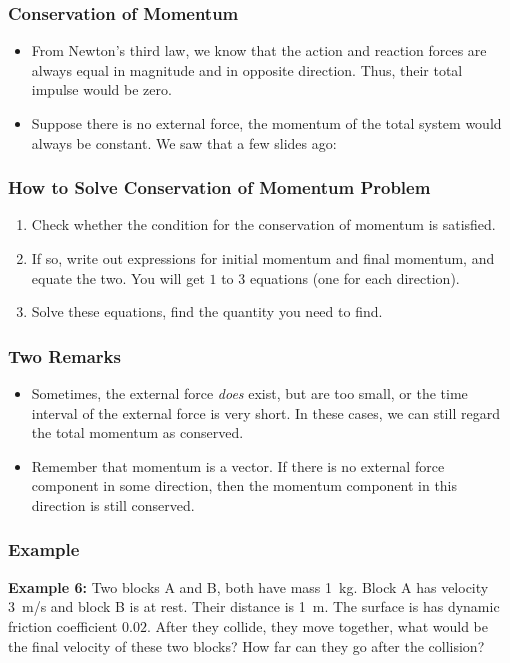 \documentclass[12pt,compress,aspectratio=169]{beamer}
\newcommand{\mb}[1]{\ensuremath\mathbf{#1}}
\begin{document}
\begin{frame}
  \frametitle{Conservation of Momentum}
  \begin{itemize}
  \item From Newton's third law, we know that the action and reaction forces are
    always equal in magnitude and in opposite direction. Thus, their total
    impulse would be zero. 
    
  \item Suppose there is no external force, the momentum of the total system
    would always be constant. We saw that a few slides ago:

    \vspace{-.2in}{\Large
      \begin{displaymath}
        \sum\mb{p}(t_1)=\sum\mb{p}(t_2)
      \end{displaymath}
    }
  \end{itemize}
\end{frame}

\begin{frame}
  \frametitle{How to Solve Conservation of Momentum Problem}
  \begin{enumerate}
  \item Check whether the condition for the conservation of momentum is
    satisfied.
  \item If so, write out expressions for initial momentum and final momentum,
    and equate the two. You will get $1$ to $3$ equations (one for each
    direction).
  \item Solve these equations, find the quantity you need to find.
  \end{enumerate}
\end{frame}

\begin{frame}
  \frametitle{Two Remarks}
  \begin{itemize}
  \item Sometimes, the external force \emph{does} exist, but are too small, or
    the time interval of the external force is very short. In these cases, we
    can still regard the total momentum as conserved.
  \item Remember that momentum is a vector. If there is no external force
    component in some direction, then the momentum component in this
    direction is still conserved.
  \end{itemize}
\end{frame}

\begin{frame}
  \frametitle{Example}
  \textbf{Example 6:} Two blocks A and B, both have mass \SI{1}{\kg}. Block A
  has velocity \SI{3}{m/\s} and block B is at rest. Their distance is
  \SI{1}{m}. The surface is has dynamic friction coefficient $0.02$. After they
  collide, they move together, what would be the final velocity of these two
  blocks? How far can they go after the collision?
\end{frame}
\end{document}
